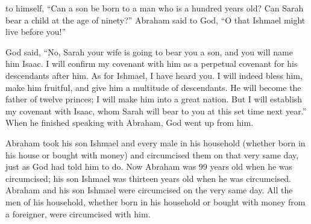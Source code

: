 {to himself, “Can a son
be born
to a man who is a hundred
years
old? Can
Sarah
bear a child
at the age
of ninety?”
Abraham
said
to
God,
“O that Ishmael
might
live
before you!”
\par }{\PP {}God
said,
“No,
Sarah
your wife
is going to bear
you a son,
and you will name
him Isaac.
I will confirm
my covenant
with
him as a perpetual
covenant
for his descendants
after him.
As for Ishmael,
I have heard
you. I will indeed
bless
him, make him fruitful,
and give him a multitude
of descendants. He will become the
father
of twelve
princes;
I will make him
into a great
nation.
But I will establish
my covenant
with
Isaac,
whom
Sarah
will bear
to you at this
set time next
year.”
When he finished
speaking
with
Abraham,
God
went up from him.
\par }{\PP {}Abraham
took
his son
Ishmael
and every
male
in his household
(whether born
in his house
or bought
with money) and circumcised
them on that
very same day,
just
as God
had told him to do.
Now Abraham
was 99
years
old
when he was circumcised;
his son
Ishmael
was thirteen
years
old when
he was circumcised.
Abraham
and his son
Ishmael
were circumcised
on the very
same day.
All
the men
of his household,
whether born
in his household
or bought
with money
from a foreigner,
were circumcised
with him.

}
